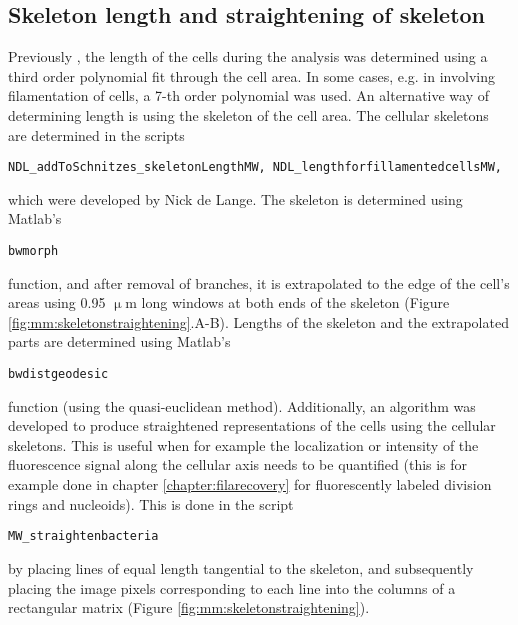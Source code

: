 \subsection{Skeleton length and straightening of skeleton}

Previously \cite{Kiviet2010}, the length of the cells during the analysis was determined using a third order polynomial fit through the cell area. 
In some cases, e.g. in involving filamentation of cells, a 7-th order polynomial was used.
An alternative way of determining length is using the skeleton of the cell area.
The cellular skeletons are determined in the scripts
\begin{verbatim}
NDL_addToSchnitzes_skeletonLengthMW, NDL_lengthforfillamentedcellsMW,
\end{verbatim}
which were developed by Nick de Lange.
The skeleton is determined using Matlab's 
\begin{verbatim}
bwmorph
\end{verbatim}
function, and after removal of branches, it is extrapolated to the edge of the cell's areas using 0.95 $\upmu$m long windows at both ends of the skeleton (Figure \ref{fig:mm:skeletonstraightening}.A-B). 
Lengths of the skeleton and the extrapolated parts are determined using Matlab's 
\begin{verbatim}
bwdistgeodesic
\end{verbatim}
function (using the quasi-euclidean method).
Additionally, an algorithm was developed to produce straightened representations of the cells using the cellular skeletons. This is useful when for example the localization or intensity of the fluorescence signal along the cellular axis needs to be quantified (this is for example done in chapter \ref{chapter:filarecovery} for fluorescently labeled division rings and nucleoids).
This is done in the script 
\begin{verbatim}
MW_straightenbacteria
\end{verbatim}
by placing lines of equal length tangential to the skeleton, and subsequently placing the image pixels corresponding to each line into the columns of a rectangular matrix (Figure \ref{fig:mm:skeletonstraightening}).

